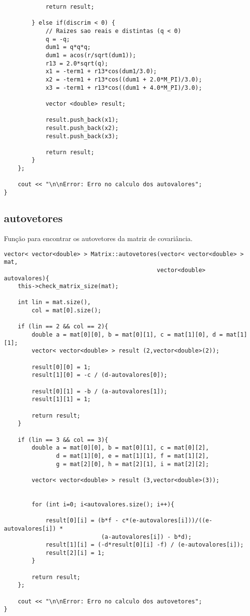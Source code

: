 \documentclass[a4paper, 11pt]{article}
\begin{document}
\begin{lstlisting}
			return result;			         
			
		} else if(discrim < 0) {
			// Raizes sao reais e distintas (q < 0) 
		    q = -q; 
		    dum1 = q*q*q; 
		    dum1 = acos(r/sqrt(dum1)); 
		    r13 = 2.0*sqrt(q); 
		    x1 = -term1 + r13*cos(dum1/3.0); 
		    x2 = -term1 + r13*cos((dum1 + 2.0*M_PI)/3.0); 
		    x3 = -term1 + r13*cos((dum1 + 4.0*M_PI)/3.0); 

			vector <double> result;

			result.push_back(x1);
			result.push_back(x2);
			result.push_back(x3);
		
			return result;		
		} 			
	};
	
	cout << "\n\nError: Erro no calculo dos autovalores";
}
\end{lstlisting}

\subsection*{autovetores}
Função para encontrar os autovetores da matriz de covariância.

\begin{lstlisting}
vector< vector<double> > Matrix::autovetores(vector< vector<double> > mat, 
											vector<double> autovalores){
	this->check_matrix_size(mat);
	
	int lin = mat.size(), 
		col = mat[0].size();
	
	if (lin == 2 && col == 2){
		double a = mat[0][0], b = mat[0][1], c = mat[1][0], d = mat[1][1];
		vector< vector<double> > result (2,vector<double>(2)); 

		result[0][0] = 1;
		result[1][0] = -c / (d-autovalores[0]);

		result[0][1] = -b / (a-autovalores[1]);
		result[1][1] = 1;
		
		return result;
	}

	if (lin == 3 && col == 3){
		double a = mat[0][0], b = mat[0][1], c = mat[0][2], 
			   d = mat[1][0], e = mat[1][1], f = mat[1][2], 
			   g = mat[2][0], h = mat[2][1], i = mat[2][2];
			   
		vector< vector<double> > result (3,vector<double>(3)); 


		for (int i=0; i<autovalores.size(); i++){

			result[0][i] = (b*f - c*(e-autovalores[i]))/((e-autovalores[i]) * 
							(a-autovalores[i]) - b*d);
			result[1][i] = (-d*result[0][i] -f) / (e-autovalores[i]);
			result[2][i] = 1;
		}
		
		return result;
	};
	
	cout << "\n\nError: Erro no calculo dos autovetores";
}	
\end{lstlisting}
\end{document}
